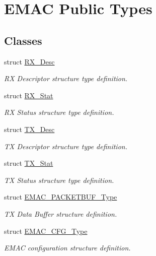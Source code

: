 \hypertarget{group___e_m_a_c___public___types}{\section{\-E\-M\-A\-C \-Public \-Types}
\label{group___e_m_a_c___public___types}
}
\subsection*{\-Classes}
\begin{DoxyCompactItemize}
\item 
struct \hyperlink{struct_r_x___desc}{\-R\-X\-\_\-\-Desc}
\begin{DoxyCompactList}\small\item\em \-R\-X \-Descriptor structure type definition. \end{DoxyCompactList}\item 
struct \hyperlink{struct_r_x___stat}{\-R\-X\-\_\-\-Stat}
\begin{DoxyCompactList}\small\item\em \-R\-X \-Status structure type definition. \end{DoxyCompactList}\item 
struct \hyperlink{struct_t_x___desc}{\-T\-X\-\_\-\-Desc}
\begin{DoxyCompactList}\small\item\em \-T\-X \-Descriptor structure type definition. \end{DoxyCompactList}\item 
struct \hyperlink{struct_t_x___stat}{\-T\-X\-\_\-\-Stat}
\begin{DoxyCompactList}\small\item\em \-T\-X \-Status structure type definition. \end{DoxyCompactList}\item 
struct \hyperlink{struct_e_m_a_c___p_a_c_k_e_t_b_u_f___type}{\-E\-M\-A\-C\-\_\-\-P\-A\-C\-K\-E\-T\-B\-U\-F\-\_\-\-Type}
\begin{DoxyCompactList}\small\item\em \-T\-X \-Data \-Buffer structure definition. \end{DoxyCompactList}\item 
struct \hyperlink{struct_e_m_a_c___c_f_g___type}{\-E\-M\-A\-C\-\_\-\-C\-F\-G\-\_\-\-Type}
\begin{DoxyCompactList}\small\item\em \-E\-M\-A\-C configuration structure definition. \end{DoxyCompactList}\end{DoxyCompactItemize}

